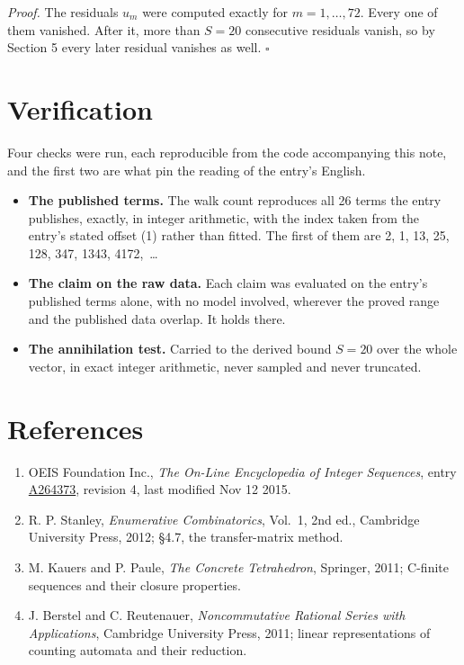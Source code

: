 \documentclass[11pt]{article}
\theoremstyle{definition}
\begin{document}
{\itshape Proof.} The residuals $u_m$ were computed exactly for $m = 1,\dots,72$. Every one of them vanished. After it, more than $S = 20$ consecutive residuals vanish, so by Section 5 every later residual vanishes as well. $\square$

\section{Verification}

Four checks were run, each reproducible from the code accompanying this note, and the first two are what pin the reading of the entry's English.

\begin{itemize}

\item {\bfseries The published terms.} The walk count reproduces all 26 terms the entry publishes, exactly, in integer arithmetic, with the index taken from the entry's stated offset (1) rather than fitted. The first of them are 2, 1, 13, 25, 128, 347, 1343, 4172,~\dots

\item {\bfseries The claim on the raw data.} Each claim was evaluated on the entry's published terms alone, with no model involved, wherever the proved range and the published data overlap. It holds there.

\item {\bfseries The annihilation test.} Carried to the derived bound $S = 20$ over the whole vector, in exact integer arithmetic, never sampled and never truncated.

\end{itemize}

\section{References}

\begin{enumerate}

\item OEIS Foundation Inc., \emph{The On-Line Encyclopedia of Integer Sequences}, entry \href{https://oeis.org/A264373}{A264373}, revision 4, last modified Nov 12 2015.

\item R. P. Stanley, \emph{Enumerative Combinatorics}, Vol.~1, 2nd ed., Cambridge University Press, 2012; \S4.7, the transfer-matrix method.

\item M. Kauers and P. Paule, \emph{The Concrete Tetrahedron}, Springer, 2011; C-finite sequences and their closure properties.

\item J. Berstel and C. Reutenauer, \emph{Noncommutative Rational Series with Applications}, Cambridge University Press, 2011; linear representations of counting automata and their reduction.

\end{enumerate}
\end{document}
